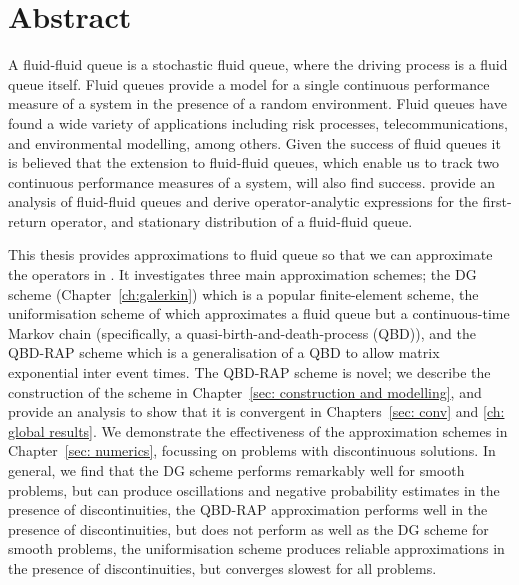\chapter{Abstract}
\label{ch:abstract}
A fluid-fluid queue is a stochastic fluid queue, where the driving process is a fluid queue itself. Fluid queues provide a model for a single continuous performance measure of a system in the presence of a random environment. Fluid queues have found a wide variety of applications including risk processes, telecommunications, and environmental modelling, among others. Given the success of fluid queues it is believed that the extension to fluid-fluid queues, which enable us to track two continuous performance measures of a system, will also find success. \cite{bo2014} provide an analysis of fluid-fluid queues and derive operator-analytic expressions for the first-return operator, and stationary distribution of a fluid-fluid queue.

This thesis provides approximations to fluid queue so that we can approximate the operators in \cite{bo2014}. It investigates three main approximation schemes; the DG scheme (Chapter~\ref{ch:galerkin}) which is a popular finite-element scheme, the uniformisation scheme of \cite{bo2013} which approximates a fluid queue but a continuous-time Markov chain (specifically, a quasi-birth-and-death-process (QBD)), and the QBD-RAP scheme which is a generalisation of a QBD to allow matrix exponential inter event times. The QBD-RAP scheme is novel; we describe the construction of the scheme in Chapter~\ref{sec: construction and modelling}, and provide an analysis to show that it is convergent in Chapters~\ref{sec: conv} and \ref{ch: global results}. We demonstrate the effectiveness of the approximation schemes in Chapter~\ref{sec: numerics}, focussing on problems with discontinuous solutions. In general, we find that the DG scheme performs remarkably well for smooth problems, but can produce oscillations and negative probability estimates in the presence of discontinuities, the QBD-RAP approximation performs well in the presence of discontinuities, but does not perform as well as the DG scheme for smooth problems, the uniformisation scheme produces reliable approximations in the presence of discontinuities, but converges slowest for all problems. 


